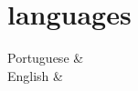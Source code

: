\documentclass[]{cv-mauri}
\begin{document}
\section*{languages}
\begin{tabularcv}
	Portuguese & \\
	English &
\end{tabularcv}

\end{document}
